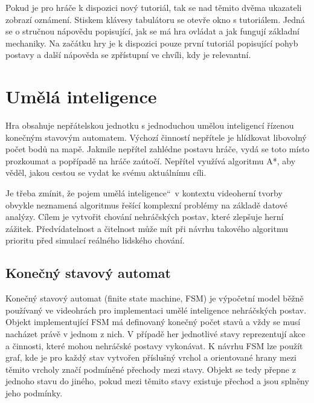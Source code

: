 \documentclass[FM,Proj,bw]{tulthesis}
\begin{document}
	Pokud je pro hráče k dispozici nový tutoriál, tak se nad těmito dvěma ukazateli zobrazí oznámení. Stiskem klávesy tabulátoru se otevře okno s tutoriálem. Jedná se o stručnou nápovědu popisující, jak se má hra ovládat a jak fungují základní mechaniky. Na začátku hry je k dispozici pouze první tutoriál popisující pohyb postavy a další nápověda se zpřístupní ve chvíli, kdy je relevantní.
	
	\section{Umělá inteligence}	
	
	Hra obsahuje nepřátelskou jednotku s jednoduchou umělou inteligencí řízenou konečným stavovým automatem. Výchozí činností nepřítele je hlídkovat libovolný počet bodů na mapě. Jakmile nepřítel zahlédne postavu hráče, vydá se toto místo prozkoumat a popřípadě na hráče zaútočí. Nepřítel využívá algoritmu A*, aby věděl, jakou cestou se vydat ke svému aktuálnímu cíli.
	
	Je třeba zmínit, že pojem \quotedblbase umělá inteligence\textquotedblleft\ v kontextu videoherní tvorby obvykle neznamená algoritmus řešící komplexní problémy na základě datové analýzy. Cílem je vytvořit chování nehráčských postav, které zlepšuje herní zážitek. Předvídatelnost a čitelnost může mít při návrhu takového algoritmu prioritu před simulací reálného lidského chování.
	\cite{gameAI}
	
	\subsection{Konečný stavový automat}
	
	Konečný stavový automat (finite state machine, FSM) je výpočetní model běžně používaný ve videohrách pro implementaci umělé inteligence nehráčských postav. Objekt implementující FSM má definovaný konečný počet stavů a vždy se musí nacházet právě v jednom z nich. V případě her jednotlivé stavy reprezentují akce a činnosti, které mohou nehráčské postavy vykonávat. K návrhu FSM lze použít graf, kde je pro každý stav vytvořen příslušný vrchol a orientované hrany mezi těmito vrcholy značí podmíněné přechody mezi stavy. Objekt se tedy přepne z jednoho stavu do jiného, pokud mezi těmito stavy existuje přechod a jsou splněny jeho podmínky.
	\cite{lit1}
	
\end{document}

